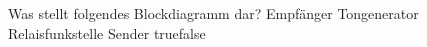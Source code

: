    {Was stellt folgendes Blockdiagramm dar?}
    {Empfänger}
    {Tongenerator}
    {Relaisfunkstelle}
    {Sender}
    {true}{false}